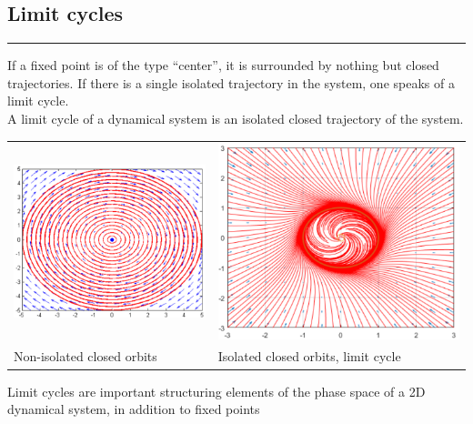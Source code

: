\subsection{Limit cycles}
\noindent\rule[\linienAbstand]{\linewidth}{\linienDicke}
If a fixed point is of the type ``center'', it is surrounded by nothing but closed trajectories. If there is a single isolated trajectory in the system, one speaks of a limit cycle.\\
A limit cycle of a dynamical system is an isolated closed trajectory of the system.
\begin{table}[H]
  \setlength{\tabcolsep}{0.2em}
  \footnotesize
  \begin{tabular}{p{}@{\hskip 1em}p{}}
    \includegraphics[width=\linewidth]{Pics/4.16.png} &
    \includegraphics[width=\linewidth]{Pics/4.34.png}\\
    Non-isolated closed orbits & Isolated closed orbits, limit cycle
  \end{tabular}
\end{table}
Limit cycles are important structuring elements of the phase space of a 2D dynamical system, in addition to fixed points\\

